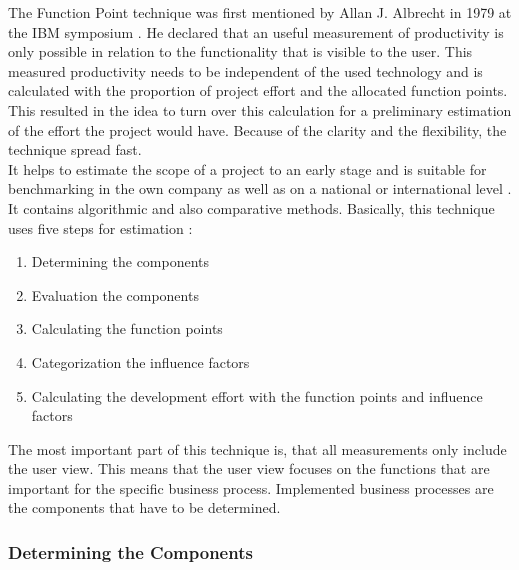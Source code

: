 The Function Point technique was first mentioned by Allan J. Albrecht in 1979 at the IBM symposium \cite{albrecht}. He declared that an useful measurement of productivity is only possible in relation to the functionality that is visible to the user. This measured productivity needs to be independent of the used technology and is calculated with the proportion of project effort and the allocated function points.\\
This resulted in the idea to turn over this calculation for a preliminary estimation of the effort the project would have. Because of the clarity and the flexibility, the technique spread fast. \\
It helps to estimate the scope of a project to an early stage and is suitable for benchmarking in the own company as well as on a national or international level \cite{FPKompakt}. It contains algorithmic and also comparative methods. Basically, this technique uses five steps for estimation \cite{jenny}:
\begin{enumerate}
	\item Determining the components
	\item Evaluation the components
	\item Calculating the function points
	\item Categorization the influence factors
	\item Calculating the development effort with the function points and influence factors
\end{enumerate}
The most important part of this technique is, that all measurements only include the user view. This means that the user view focuses on the functions that are important for the specific business process. Implemented business processes are the components that have to be determined.

\subsubsection{Determining the Components}\label{fpcomponents}

